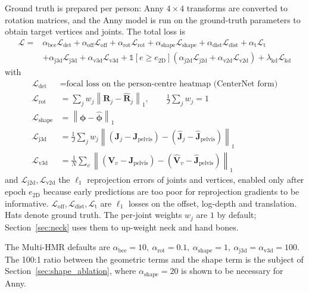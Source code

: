 Ground truth is prepared per person: Anny $4{\times}4$ transforms are converted
to rotation matrices, and the Anny model is run on the ground-truth parameters
to obtain target vertices and joints. The total loss is
\begin{equation}
\begin{split}
\mathcal{L} = {}& \alpha_{\text{bce}}\mathcal{L}_{\text{det}}
  + \alpha_{\text{off}}\mathcal{L}_{\text{off}}
  + \alpha_{\text{rot}}\mathcal{L}_{\text{rot}}
  + \alpha_{\text{shape}}\mathcal{L}_{\text{shape}}
  + \alpha_{\text{dist}}\mathcal{L}_{\text{dist}}
  + \alpha_{\text{t}}\mathcal{L}_{\text{t}} \\
  &+ \alpha_{\text{j3d}}\mathcal{L}_{\text{j3d}}
  + \alpha_{\text{v3d}}\mathcal{L}_{\text{v3d}}
  + \mathbb{1}[e \ge e_{2\text{D}}]\left(\alpha_{\text{j2d}}\mathcal{L}_{\text{j2d}}
  + \alpha_{\text{v2d}}\mathcal{L}_{\text{v2d}}\right)
  + \lambda_{\text{kd}}\mathcal{L}_{\text{kd}}
\end{split}
\label{eq:loss}
\end{equation}
with
\begin{align}
\mathcal{L}_{\text{det}} &= \text{focal loss on the person-centre heatmap (CenterNet form)}\\
\mathcal{L}_{\text{rot}} &= \sum_{j} w_j \left\| \mathbf{R}_j - \hat{\mathbf{R}}_j \right\|_1,
  \qquad \textstyle\frac{1}{J}\sum_j w_j = 1\\
\mathcal{L}_{\text{shape}} &= \left\| \boldsymbol{\phi} - \hat{\boldsymbol{\phi}} \right\|_1\\
\mathcal{L}_{\text{j3d}} &= \frac{1}{J}\sum_j w_j\left\| (\mathbf{J}_j - \mathbf{J}_{\text{pelvis}}) - (\hat{\mathbf{J}}_j - \hat{\mathbf{J}}_{\text{pelvis}}) \right\|_1\\
\mathcal{L}_{\text{v3d}} &= \frac{1}{N}\sum_v \left\| (\mathbf{V}_v - \mathbf{J}_{\text{pelvis}}) - (\hat{\mathbf{V}}_v - \hat{\mathbf{J}}_{\text{pelvis}}) \right\|_1
\end{align}
and $\mathcal{L}_{\text{j2d}},\mathcal{L}_{\text{v2d}}$ the $\ell_1$ reprojection
errors of joints and vertices, enabled only after epoch $e_{2\text{D}}$ because
early predictions are too poor for reprojection gradients to be informative.
$\mathcal{L}_{\text{off}},\mathcal{L}_{\text{dist}},\mathcal{L}_{\text{t}}$ are
$\ell_1$ losses on the offset, log-depth and translation. Hats denote ground
truth. The per-joint weights $w_j$ are $1$ by default; Section~\ref{sec:neck}
uses them to up-weight neck and hand bones.

The Multi-HMR defaults are
$\alpha_{\text{bce}}{=}10,\ \alpha_{\text{rot}}{=}0.1,\ \alpha_{\text{shape}}{=}1,\
\alpha_{\text{j3d}}{=}\alpha_{\text{v3d}}{=}100$. The 100:1 ratio between the
geometric terms and the shape term is the subject of
Section~\ref{sec:shape_ablation}, where $\alpha_{\text{shape}}{=}20$ is shown to
be necessary for Anny.

